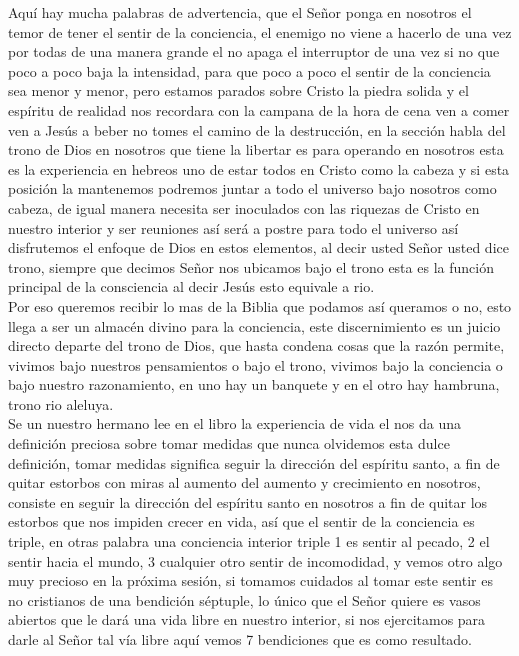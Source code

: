 \documentclass[12pt]{article}
\begin{document}
Aquí hay mucha palabras de advertencia, que el Señor ponga en nosotros el temor de tener el sentir de la conciencia, el enemigo no viene a hacerlo de una vez por todas de una manera grande el no apaga el interruptor de una vez si no que poco a poco baja la intensidad, para que poco a poco el sentir de la conciencia sea menor y menor, pero estamos parados sobre Cristo la piedra solida y el espíritu de realidad nos recordara con la campana de la hora de cena ven a comer ven a Jesús a beber no tomes el camino de la destrucción, en la sección habla del trono de Dios en nosotros que tiene la libertar es para operando en nosotros esta es la experiencia en hebreos uno de estar todos en Cristo como la cabeza y si esta posición la mantenemos podremos juntar a todo el universo bajo nosotros como cabeza, de igual manera necesita ser inoculados con las riquezas de Cristo en nuestro interior y ser reuniones así será a postre para todo el universo así disfrutemos el enfoque de Dios en estos elementos, al decir usted Señor usted dice trono, siempre que decimos Señor nos ubicamos bajo el trono esta es la función principal de la consciencia al decir Jesús esto equivale a rio.\\

Por eso queremos recibir lo mas de la Biblia que podamos así queramos o no, esto llega a ser un almacén divino para la conciencia, este discernimiento es un juicio directo departe del trono de Dios, que hasta condena cosas que la razón permite, vivimos bajo nuestros pensamientos o bajo el trono, vivimos bajo la conciencia o bajo nuestro razonamiento, en uno hay un banquete y en el otro hay hambruna, trono rio aleluya.\\

Se un nuestro hermano lee en el libro la experiencia de vida el nos da una definición preciosa sobre tomar medidas que nunca olvidemos esta dulce definición, tomar medidas significa seguir la dirección del espíritu santo, a fin de quitar estorbos con miras al aumento del aumento y crecimiento en nosotros, consiste en seguir la dirección del espíritu santo en nosotros a fin de quitar los estorbos que nos impiden crecer en vida, así que el sentir de la conciencia es triple, en otras palabra una conciencia interior triple 1 es sentir al pecado, 2 el sentir hacia el mundo, 3 cualquier otro sentir de incomodidad, y vemos otro algo muy precioso en la próxima sesión, si tomamos cuidados al tomar este sentir es no cristianos de una bendición séptuple, lo único que el Señor quiere es vasos abiertos que le dará una vida libre en nuestro interior, si nos ejercitamos para darle al Señor tal vía libre aquí vemos 7 bendiciones que es como resultado. \\
\end{document}
